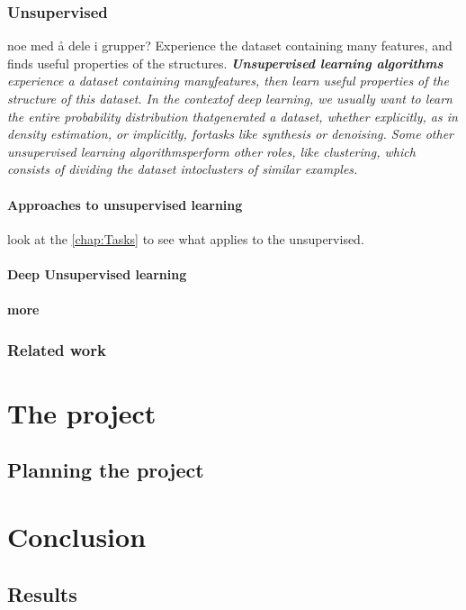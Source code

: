 \documentclass[a4paper,english]{ifimaster}
\begin{document}
\section{Unsupervised}
noe med å dele i grupper?
Experience the dataset containing many features, and finds useful properties of the structures. 
\textit{\textbf{Unsupervised learning algorithms} experience a dataset containing manyfeatures, then learn useful properties of the structure of this dataset. In the contextof deep learning, we usually want to learn the entire probability distribution thatgenerated a dataset, whether explicitly, as in density estimation, or implicitly, fortasks like synthesis or denoising. Some other unsupervised learning algorithmsperform other roles, like clustering, which consists of dividing the dataset intoclusters of similar examples.}
\cite{Goodfellow-et-al-2016}


\subsection{Approaches to unsupervised learning}
look at the \autoref{chap:Tasks} to see what applies to the unsupervised.

\subsection{Deep Unsupervised learning}
\subsection{more}
\section{Related work}


	      
		
		
		
		
		
		
		
		
		
		
		
		
		
		
		
		
		
		
		
		
		
		
		
		
		
\part{The project}

\chapter{Planning the project}

\part{Conclusion}

\chapter{Results}

\backmatter{}

\printbibliography
\end{document}
